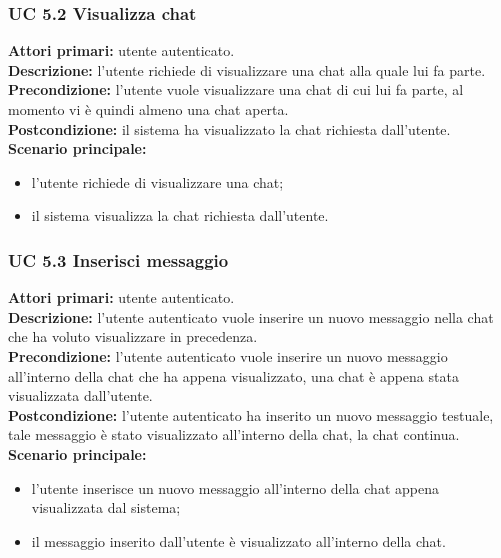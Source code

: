 \subsubsection{UC 5.2 Visualizza chat}
\noindent
\textbf{Attori primari:} utente autenticato.\\
\textbf{Descrizione:} l'utente richiede di visualizzare una chat alla quale lui fa parte.\\
\textbf{Precondizione:} l'utente vuole visualizzare una chat di cui lui fa parte, al momento vi è quindi almeno una chat aperta.\\
\textbf{Postcondizione:} il sistema ha visualizzato la chat richiesta dall'utente.\\
\textbf{Scenario principale:}
\begin{itemize}
\item l'utente richiede di visualizzare una chat;
\item il sistema visualizza la chat richiesta dall'utente.
\end{itemize}


\subsubsection{UC 5.3 Inserisci messaggio}
\noindent
\textbf{Attori primari:} utente autenticato.\\
\textbf{Descrizione:} l'utente autenticato vuole inserire un nuovo messaggio nella chat che ha voluto visualizzare in precedenza.\\
\textbf{Precondizione:} l'utente autenticato vuole inserire un nuovo messaggio all'interno della chat che ha appena visualizzato, una chat è appena stata visualizzata dall'utente.\\
\textbf{Postcondizione:} l'utente autenticato ha inserito un nuovo messaggio testuale, tale messaggio è stato visualizzato all'interno della chat, la chat continua.\\
\textbf{Scenario principale:}
\begin{itemize}
\item l'utente inserisce un nuovo messaggio all'interno della chat appena visualizzata dal sistema;
\item il messaggio inserito dall'utente è visualizzato all'interno della chat.
\end{itemize}

